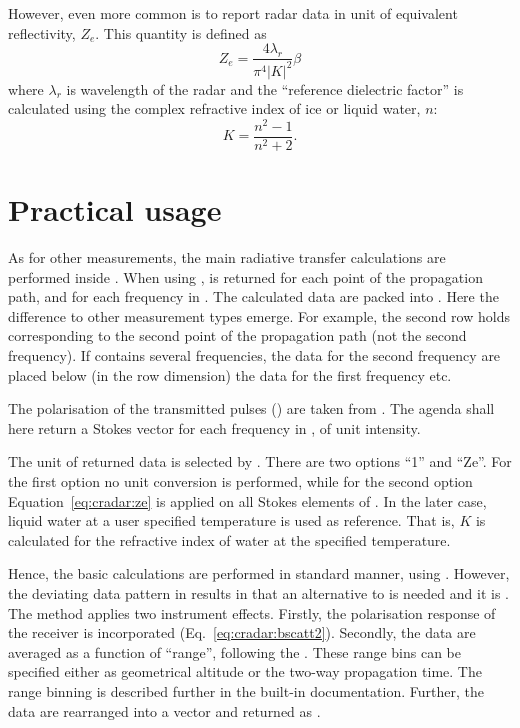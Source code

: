 However, even more common is to report radar data in unit of equivalent
reflectivity, $Z_e$. This quantity is defined as \citep[e.g.][]{donovan:01}
\begin{equation}
  \label{eq:cradar:ze}
  Z_e = \frac{4\lambda_r}{\pi^4|K|^2}\beta
\end{equation}
where $\lambda_r$ is wavelength of the radar and the ``reference dielectric
factor'' is calculated using the complex refractive index of ice or liquid
water, $n$:
\begin{equation}
  K = \frac{n^2-1}{n^2+2}.
\end{equation}



\section{Practical usage}
\label{sec:cradar:usage}

As for other measurements, the main radiative transfer calculations are
performed inside . When using
,  is returned
for each point of the propagation path, and for each frequency in
. The calculated data are packed into . Here
the difference to other measurement types emerge. For example, the second row
holds  corresponding to the second point of the propagation path
(not the second frequency). If  contains several
frequencies, the data for the second frequency are placed below (in the row
dimension) the data for the first frequency etc. 

The polarisation of the transmitted pulses () are taken from
. The agenda shall here return a Stokes
vector for each frequency in , of unit intensity.

The unit of returned data is selected by . There are two
options ``1'' and ``Ze''. For the first option no unit conversion is performed,
while for the second option Equation~\ref{eq:cradar:ze} is applied on all
Stokes elements of . In the later case, liquid water at a user
specified temperature is used as reference. That is, $K$ is calculated for the
refractive index of water at the specified temperature.

Hence, the basic calculations are performed in standard manner, using
. However, the deviating data pattern in
 results in that an alternative to  is needed
and it is . The method applies two instrument effects.
Firstly, the polarisation response of the receiver is incorporated
(Eq.~\ref{eq:cradar:bscatt2}). Secondly, the data are averaged as a
function of ``range'', following the . These range bins
can be specified either as geometrical altitude or the two-way propagation time.
The range binning is described further in the built-in documentation.
Further, the data are rearranged into a vector and returned as .

